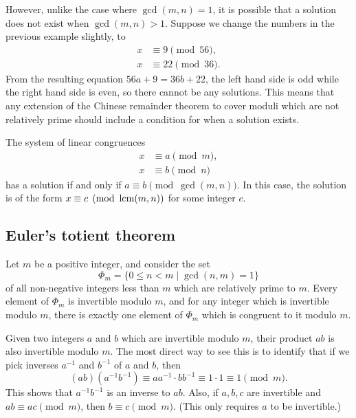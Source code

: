 However, unlike the case where $\gcd(m,n) = 1$, it is possible that a solution does not exist when $\gcd(m,n) > 1$. Suppose we change the numbers in the previous example slightly, to
\begin{align*}
x &\equiv 9\pmod{56}, \\
x &\equiv 22\pmod{36}.
\end{align*}
From the resulting equation $56a + 9 = 36b + 22$, the left hand side is odd while the right hand side is even, so there cannot be any solutions. This means that any extension of the Chinese remainder theorem to cover moduli which are not relatively prime should include a condition for when a solution exists.

\begin{proposition}
The system of linear congruences
\begin{align*}
x &\equiv a\pmod{m}, \\
x &\equiv b\pmod{n}
\end{align*}
has a solution if and only if $a\equiv b\pmod{\gcd(m,n)}$. In this case, the solution is of the form $x\equiv c\pmod{\operatorname{lcm}(m,n)}$ for some integer $c$.
\end{proposition}


\subsection{Euler's totient theorem}

Let $m$ be a positive integer, and consider the set
\begin{equation*}
\Phi_m = \{0\leq n < m\mid \gcd(n,m) = 1\}
\end{equation*}
of all non-negative integers less than $m$ which are relatively prime to $m$. Every element of $\Phi_m$ is invertible modulo $m$, and for any integer which is invertible modulo $m$, there is exactly one element of $\Phi_m$ which is congruent to it modulo $m$.

Given two integers $a$ and $b$ which are invertible modulo $m$, their product $ab$ is also invertible modulo $m$. The most direct way to see this is to identify that if we pick inverses $a^{-1}$ and $b^{-1}$ of $a$ and $b$, then
\begin{equation*}
(ab)(a^{-1}b^{-1})\equiv aa^{-1}\cdot bb^{-1}\equiv 1\cdot 1\equiv 1\pmod{m}.
\end{equation*}
This shows that $a^{-1}b^{-1}$ is an inverse to $ab$. Also, if $a,b,c$ are invertible and $ab\equiv ac\pmod{m}$, then $b\equiv c\pmod{m}$. (This only requires $a$ to be invertible.)

